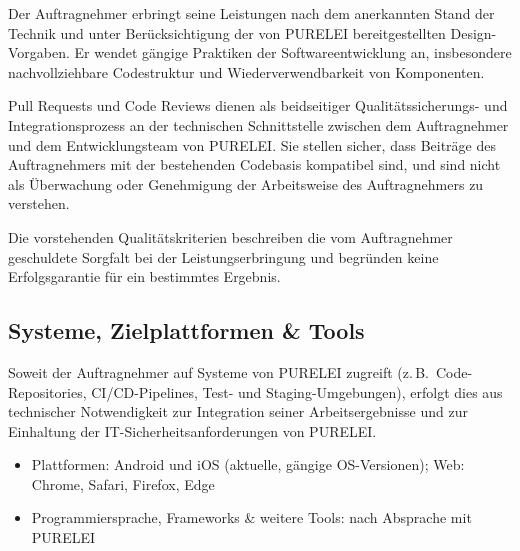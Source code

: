 \documentclass[11pt,a4paper]{article}
\newcommand{\ClientKurzname}{PURELEI}
\begin{document}
Der Auftragnehmer erbringt seine Leistungen nach dem anerkannten Stand der Technik und unter Berücksichtigung der von \ClientKurzname{} bereitgestellten Design-Vorgaben. Er wendet gängige Praktiken der Softwareentwicklung an, insbesondere nachvollziehbare Codestruktur und Wiederverwendbarkeit von Komponenten.

Pull Requests und Code Reviews dienen als beidseitiger Qualitätssicherungs- und Integrationsprozess an der technischen Schnittstelle zwischen dem Auftragnehmer und dem Entwicklungsteam von \ClientKurzname. Sie stellen sicher, dass Beiträge des Auftragnehmers mit der bestehenden Codebasis kompatibel sind, und sind nicht als Überwachung oder Genehmigung der Arbeitsweise des Auftragnehmers zu verstehen.

Die vorstehenden Qualitätskriterien beschreiben die vom Auftragnehmer geschuldete Sorgfalt bei der Leistungserbringung und begründen keine Erfolgsgarantie für ein bestimmtes Ergebnis.

\subsection*{Systeme, Zielplattformen \& Tools}

Soweit der Auftragnehmer auf Systeme von \ClientKurzname{} zugreift (z.\,B.\ Code-Repositories, CI/CD-Pipelines, Test- und Staging-Umgebungen), erfolgt dies aus technischer Notwendigkeit zur Integration seiner Arbeitsergebnisse und zur Einhaltung der IT-Sicherheitsanforderungen von \ClientKurzname.

\begin{itemize}[itemsep=1pt,topsep=2pt]
\item Plattformen: Android und iOS (aktuelle, gängige OS-Versionen); Web: Chrome, Safari, Firefox, Edge
\item Programmiersprache, Frameworks \& weitere Tools: nach Absprache mit \ClientKurzname
\end{itemize}
\end{document}
